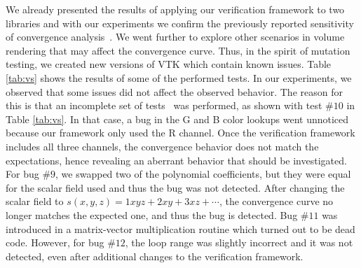 We already presented the results of applying our verification
framework to two libraries and with our experiments we confirm the
previously reported sensitivity of convergence
analysis~\cite{Roy2005}. We went further to explore other scenarios in
volume rendering that may affect the convergence curve. Thus, in the
spirit of mutation testing, we created new versions of VTK which
contain known issues. Table \ref{tab:vs} shows the results of some of
the performed tests. In our experiments, we observed that some issues
did not affect the observed behavior.  The reason for this is that an
incomplete set of tests~\cite{KnuppSalari02} was performed, as shown
with test $\#10$ in Table \ref{tab:vs}. In that case, a bug in the G
and B color lookups went unnoticed because our framework only used the
R channel. Once the verification framework includes all three
channels, the convergence behavior does not match the expectations, 
hence revealing an aberrant behavior that should be investigated. For bug $\#9$, we swapped two of the polynomial coefficients,
but they were equal for the scalar field used and thus the bug was not
detected. After changing the scalar field to $s(x,y,z) = 1xyz + 2xy +
3xz + \cdots$, the convergence curve no longer matches the expected one,
and thus the bug is detected. Bug $\#11$ was introduced in a
matrix-vector multiplication routine which turned out to be dead
code. However, for bug $\#12$, the loop range was slightly incorrect
and it was not detected, even after additional changes to the
verification framework.

